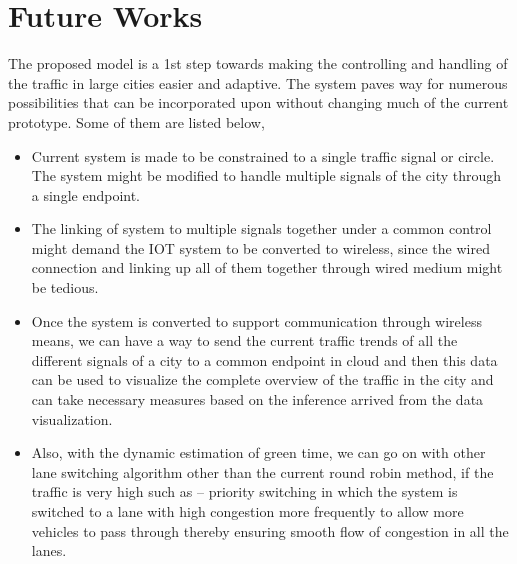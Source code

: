 \section{Future Works}
The proposed model is a 1st step towards making the controlling and handling of the traffic in large cities easier and adaptive. The system paves way for numerous possibilities that can be incorporated upon without changing much of the current prototype. Some of them are listed below,
\begin{itemize}
\item Current system is made to be constrained to a single traffic signal or circle. The system might be modified to handle multiple signals of the city through a single endpoint.
\item The linking of system to multiple signals together under a common control might demand the IOT system to be converted to wireless, since the wired connection and linking up all of them together through wired medium might be tedious.
\item Once the system is converted to support communication through wireless means, we can have a way to send the current traffic trends of all the different signals of a city to a common endpoint in cloud and then this data can be used to visualize the complete overview of the traffic in the city and can take necessary measures based on the inference arrived from the data visualization.
\item Also, with the dynamic estimation of green time, we can go on with other lane switching algorithm other than the current round robin method, if the traffic is very high such as – priority switching in which the system is switched to a lane with high congestion more frequently to allow more vehicles to pass through thereby ensuring smooth flow of congestion in all the lanes.
\end{itemize}

\pagebreak
